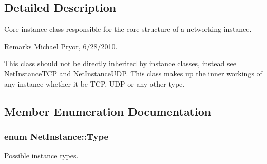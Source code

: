 \subsection{Detailed Description}
Core instance class responsible for the core structure of a networking instance. \begin{DoxyRemark}{Remarks}
Michael Pryor, 6/28/2010.
\end{DoxyRemark}
This class should not be directly inherited by instance classes, instead see \hyperlink{class_net_instance_t_c_p}{NetInstanceTCP} and \hyperlink{class_net_instance_u_d_p}{NetInstanceUDP}. This class makes up the inner workings of any instance whether it be TCP, UDP or any other type. 

\subsection{Member Enumeration Documentation}
\hypertarget{class_net_instance_a0ec01a76d9b78794cfbdeab10a436cdc}{
\subsubsection[{Type}]{\setlength{\rightskip}{0pt plus 5cm}enum {\bf NetInstance::Type}}}
\label{class_net_instance_a0ec01a76d9b78794cfbdeab10a436cdc}


Possible instance types. 

